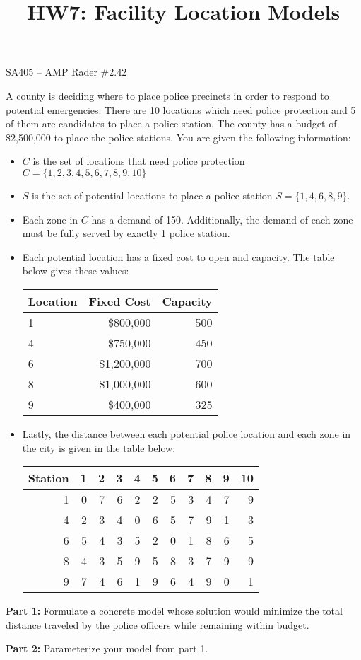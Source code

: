 \documentclass[11pt]{article}
\makeatletter
\theoremstyle{definition}
\renewcommand{\maketitle}{
  \noindent SA405 -- AMP \hfill Rader \#2.42 \\

  \begin{center}\Large{\textbf{\@title}}\end{center}
}
\makeatother
\begin{document}
  
\title{HW7: Facility Location Models}


\maketitle

% 
A county is deciding where to place police precincts in order to respond to potential emergencies. There are 10 locations which need police protection and 5 of them are candidates to place a police station. The county has a budget of \$2,500,000 to place the police stations. You are given the following information:
\begin{itemize}
\item $C$ is the set of locations that need police protection $C = \{1,2,3,4,5,6,7,8,9,10\}$
\item $S$ is the set of potential locations to place a police station $S = \{1,4,6,8,9\}$. 
\item Each zone in $C$ has a demand of 150. Additionally, the demand of each zone must be fully served by exactly 1 police station.
\item Each potential location has a fixed cost to open and capacity. The table below gives these values:

\begin{center}
\begin{tabular}{|l|r|r|} \hline
Location & Fixed Cost & Capacity \\ \hline
1 & \$800,000 & 500 \\
4 & \$750,000 & 450 \\
6 & \$1,200,000 & 700 \\
8 & \$1,000,000 & 600 \\
9 & \$400,000 & 325  \\ \hline
\end{tabular}
\end{center}

\item Lastly, the distance between each potential police location and each zone in the city is given in the table below:

\begin{center}
\begin{tabular}{|r|r|r|r|r|r|r|r|r|r|r|} \hline
Station & 1 & 2 & 3 & 4 & 5 & 6 & 7 & 8 & 9 & 10 \\ \hline
1       & 0 & 7 & 6 & 2 & 2 & 5 & 3 & 4 & 7 & 9 \\
4       & 2 & 3 & 4 & 0 & 6 & 5 & 7 & 9 & 1 & 3 \\
6       & 5 & 4 & 3 & 5 & 2 & 0 & 1 & 8 & 6 & 5 \\
8       & 4 & 3 & 5 & 9 & 5 & 8 & 3 & 7 & 9 & 9 \\
9       & 7 & 4 & 6 & 1 & 9 & 6 & 4 & 9 & 0 & 1 \\ \hline
\end{tabular}
\end{center}
\end{itemize}

\textbf{Part 1:} Formulate a concrete model whose solution would minimize the total distance traveled by the police officers while remaining within budget.

\textbf{Part 2:} Parameterize your model from part 1.
\end{document}

